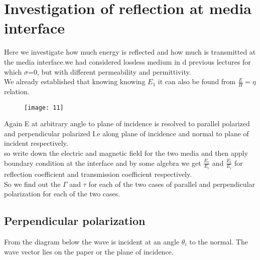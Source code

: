 \chapter{Investigation of reflection at media interface}
Here we investigate how much energy is reflected and how much is transmitted at the media interface.we had considered lossless medium in d previous lectures for which $ \sigma $=0, but with different permeability and permittivity.\\
We already established that knowing knowing $E_{1}$ it can also be found from $\frac{E}{H} = \eta$ relation.\\
\begin{figure}[h]
	\centering
	\texttt{[image: 11]}
	\caption{}
\end{figure}
 Again E at arbitrary angle to plane of incidence is resolved to parallel polarized and perpendicular polarized I.e along plane of incidence  and normal to plane of incident respectively.\\
 so write down the electric and magnetic field for the two media and then apply boundary condition at the interface and by some algebra we get $\frac{E_{r}}{E_{i}}$ and $\frac{E_{t}}{E_{i}}$ for reflection coefficient  and transmission  coefficient  respectively.\\ So we find out the $\Gamma$ and $\tau$ for each of the two cases of parallel and perpendicular  polarization for each of the two cases.
\section{Perpendicular polarization} 
From the diagram below the wave is incident at an angle $\theta_{i}$ to the normal. The wave vector lies on the paper or the plane of incidence.\\


